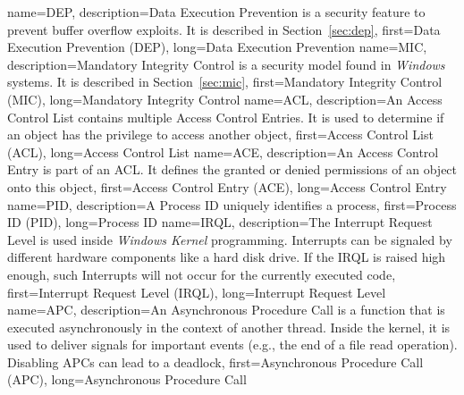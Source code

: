 {
  name={DEP},
  description={Data Execution Prevention is a security feature to prevent buffer overflow exploits. It is described in Section~\ref{sec:dep}},
  first={Data Execution Prevention (DEP)},
  long={Data Execution Prevention}
}
{
  name={MIC},
  description={Mandatory Integrity Control is a security model found in \emph{Windows} systems. It is described in Section~\ref{sec:mic}},
  first={Mandatory Integrity Control (MIC)},
  long={Mandatory Integrity Control}
}
{
  name={ACL},
  description={An Access Control List contains multiple Access Control Entries. It is used to determine if an object has the privilege to access another object},
  first={Access Control List (ACL)},
  long={Access Control List}
}
{
  name={ACE},
  description={An Access Control Entry is part of an ACL. It defines the granted or denied permissions of an object onto this object},
  first={Access Control Entry (ACE)},
  long={Access Control Entry}
}
{
  name={PID},
  description={A Process ID uniquely identifies a process},
  first={Process ID (PID)},
  long={Process ID}
}
{
  name={IRQL},
  description={The Interrupt Request Level is used inside \emph{Windows Kernel} programming. Interrupts can be signaled by different hardware components like a hard disk drive. If the IRQL is raised high enough, such Interrupts will not occur for the currently executed code},
  first={Interrupt Request Level (IRQL)},
  long={Interrupt Request Level}
}
{
  name={APC},
  description={An Asynchronous Procedure Call is a function that is executed asynchronously in the context of another thread. Inside the kernel, it is used to deliver signals for important events (e.g., the end of a file read operation). Disabling APCs can lead to a deadlock},
  first={Asynchronous Procedure Call (APC)},
  long={Asynchronous Procedure Call}
}